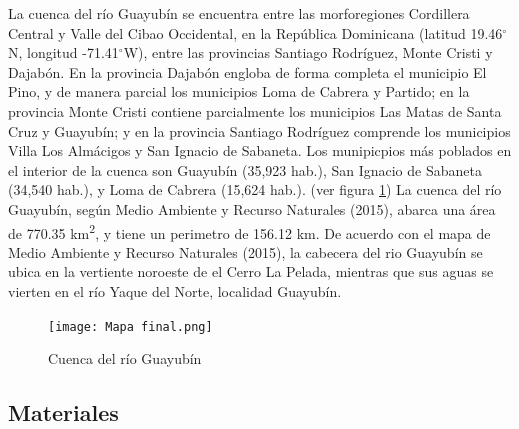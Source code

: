 \documentclass[11pt,]{article}
\begin{document}
La cuenca del río Guayubín se encuentra entre las morforegiones
Cordillera Central y Valle del Cibao Occidental, en la República
Dominicana (latitud 19.46\(^\circ\)N, longitud -71.41\(^\circ\)W), entre
las provincias Santiago Rodríguez, Monte Cristi y Dajabón. En la
provincia Dajabón engloba de forma completa el municipio El Pino, y de
manera parcial los municipios Loma de Cabrera y Partido; en la provincia
Monte Cristi contiene parcialmente los municipios Las Matas de Santa
Cruz y Guayubín; y en la provincia Santiago Rodríguez comprende los
municipios Villa Los Almácigos y San Ignacio de Sabaneta. Los
munipicpios más poblados en el interior de la cuenca son Guayubín
(35,923 hab.), San Ignacio de Sabaneta (34,540 hab.), y Loma de Cabrera
(15,624 hab.). (ver figura \ref {mapacuenca}) La cuenca del río
Guayubín, según Medio Ambiente y Recurso Naturales (2015), abarca una
área de 770.35 km\textsuperscript{2}, y tiene un perimetro de 156.12 km.
De acuerdo con el mapa de Medio Ambiente y Recurso Naturales (2015), la
cabecera del rio Guayubín se ubica en la vertiente noroeste de el Cerro
La Pelada, mientras que sus aguas se vierten en el río Yaque del Norte,
localidad Guayubín.

\begin{figure}
\centering
\texttt{[image: Mapa final.png]}
\caption{Cuenca del río Guayubín\label{mapacuenca}}
\end{figure}

\subsection{Materiales}\label{materiales}
\end{document}
